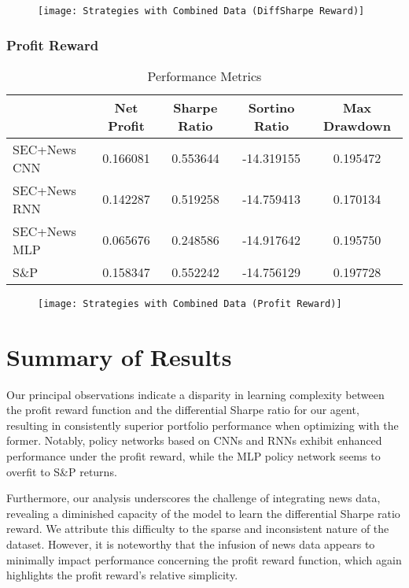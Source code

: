   \begin{center}
    \begin{figure}
    \texttt{[image: Strategies with Combined Data (DiffSharpe Reward)]}
    \end{figure}
\end{center}

\subsubsection{Profit Reward}

\begin{table}[htbp]
    \centering
    \caption{Performance Metrics}
      \begin{tabular}{lcccc}
      \toprule
            & Net Profit & Sharpe Ratio & Sortino Ratio & Max Drawdown \\
      \midrule
      SEC+News CNN & 0.166081 & 0.553644 & -14.319155 & 0.195472 \\
      SEC+News RNN & 0.142287 & 0.519258 & -14.759413 & 0.170134 \\
      SEC+News MLP & 0.065676 & 0.248586 & -14.917642 & 0.195750 \\
      S\&P   & 0.158347 & 0.552242 & -14.756129 & 0.197728 \\
      \bottomrule
      \end{tabular}%
    \label{tab:addlabel}%
  \end{table}%

  \begin{center}
    \begin{figure}
    \texttt{[image: Strategies with Combined Data (Profit Reward)]}
    \end{figure}
\end{center}


\section{Summary of Results}
Our principal observations indicate a disparity in learning complexity between the profit reward function and the differential Sharpe ratio for our agent, resulting in consistently superior portfolio performance when optimizing with the former. 
Notably, policy networks based on CNNs and RNNs exhibit enhanced performance under the profit reward, while the MLP policy network seems to overfit to S\&P returns.

Furthermore, our analysis underscores the challenge of integrating news data, revealing a diminished capacity of the model to learn the differential Sharpe ratio reward. We attribute this difficulty to the sparse and inconsistent nature of the dataset. However, it is noteworthy that the infusion of news data appears to minimally impact performance concerning the profit reward function, which again highlights the profit reward's relative simplicity.

